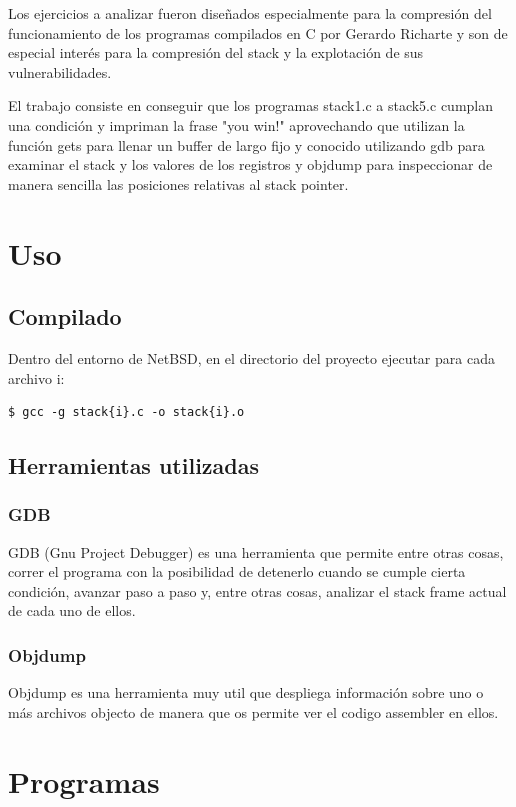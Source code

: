 \documentclass[a4paper,10pt]{article}
\begin{document}
Los ejercicios a analizar fueron diseñados especialmente para la compresión del funcionamiento de los programas compilados en C por Gerardo Richarte y son de especial interés para la compresión del stack y la explotación de sus vulnerabilidades.
\par El trabajo consiste en conseguir que los programas stack1.c a stack5.c cumplan una condición y impriman la frase "you win!" aprovechando que utilizan la función gets para llenar un buffer de largo fijo y conocido utilizando gdb para examinar el stack y los valores de los registros y objdump para inspeccionar de manera sencilla las posiciones relativas al stack pointer.


\newpage
\section{Uso}
\subsection{Compilado}
Dentro del entorno de NetBSD, en el directorio del proyecto ejecutar para cada archivo i:

\begin{verbatim}
$ gcc -g stack{i}.c -o stack{i}.o
\end{verbatim}

\subsection{Herramientas utilizadas}
\subsubsection{GDB}

GDB (Gnu Project Debugger) es una herramienta que permite entre otras cosas, correr el programa con la posibilidad de detenerlo cuando se cumple cierta condición, avanzar paso a paso y, entre otras cosas, analizar el stack frame actual de cada uno de ellos.


\subsubsection{Objdump}

Objdump es una herramienta muy util que despliega información sobre uno o más archivos objecto de manera que os permite ver el codigo assembler en ellos.

\newpage
\section{Programas}
\end{document}
